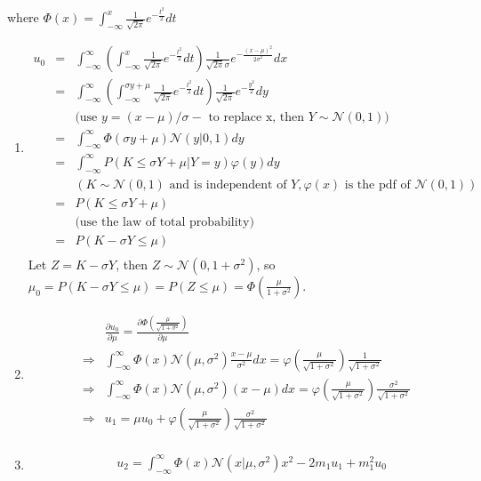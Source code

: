 \documentclass[10pt,a4paper]{article}
\def\MN{{\mathcal N}}
\begin{document}
\begin{enumerate}
\begin{enumerate}
where $\Phi(x) = \int_{-\infty}^{x} \frac{1}{\sqrt{2\pi}} e^{-\frac{t^2}{2}} dt$
\end{enumerate}
\begin{enumerate}
\item 
\begin{eqnarray*}
u_0 &=& \int_{-\infty}^{\infty} \left(\int_{-\infty}^{x} \frac{1}{\sqrt{2\pi}} e^{-\frac{t^2}{2}} dt \right) \frac{1}{\sqrt{2\pi}\sigma} e^{-\frac{(x-\mu)^2}{2\sigma^2}} dx \\
&=& \int_{-\infty}^{\infty} \left(\int_{-\infty}^{\sigma y+\mu} \frac{1}{\sqrt{2\pi}} e^{-\frac{t^2}{2}} dt\right) \frac{1}{\sqrt{2\pi}} e^{-\frac{y^2}{2}} dy   \\
&& \mbox{(use }y=(x-\mu)/\sigma-\mbox{ to replace x, then }Y\sim \MN(0,1))\\
&=&\int_{-\infty}^{\infty} \Phi(\sigma y+\mu) \MN(y|0, 1) dy \\
&=&\int_{-\infty}^{\infty} P(K\le \sigma Y+\mu | Y=y) \varphi(y) dy  \\
&&(K \sim \MN(0,1) \mbox{ and is independent of }Y, \varphi(x)\mbox{ is the pdf of }\MN(0,1)) \\
&=&P(K\le \sigma Y+\mu) \\
&&\mbox{(use the law of total probability)}\\
&=&P(K-\sigma Y\le \mu) \\
\end{eqnarray*}
Let $Z=K-\sigma Y$, then $Z\sim \MN(0,1+\sigma^2)$, so $\mu_0=P(K-\sigma Y\le \mu) = P(Z\le \mu) = \Phi(\frac{\mu}{1+\sigma^2})$.
\item 
\begin{eqnarray*}
&& \frac{\partial u_0}{\partial \mu} = \frac{\partial \Phi(\frac{\mu}{\sqrt{1+\sigma^2}})}{\partial \mu} \\
&\Longrightarrow &\int_{-\infty}^{\infty}\Phi(x)\MN(\mu,\sigma^2)\frac{x-\mu}{\sigma^2}dx = \varphi(\frac{\mu}{\sqrt{1+\sigma^2}})\frac{1}{\sqrt{1+\sigma^2}} \\
&\Longrightarrow &\int_{-\infty}^{\infty}\Phi(x)\MN(\mu,\sigma^2)(x-\mu)dx = \varphi(\frac{\mu}{\sqrt{1+\sigma^2}})\frac{\sigma^2}{\sqrt{1+\sigma^2}} \\
&\Longrightarrow &u_1 = \mu u_0+ \varphi(\frac{\mu}{\sqrt{1+\sigma^2}})\frac{\sigma^2}{\sqrt{1+\sigma^2}} \\
\end{eqnarray*}
\item
\begin{eqnarray*}
&& u_2 = \int_{-\infty}^{\infty} \Phi(x) \MN(x|\mu, \sigma^2)x^2 - 2m_1 u_1 + m_1^2u_0 \\

\end{eqnarray*}
\end{enumerate}
\end{enumerate}
\end{document}
